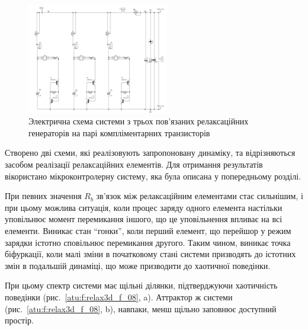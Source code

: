 \documentclass[a4paper,13pt]{atuaref}
\begin{document}

\begin{figure}[htb!]
  \centerline{\includegraphics[width=0.55\textwidth]{p7/p/relax3d_schem.png} }
  \caption{Электрична схема системи з трьох пов'язаних релаксаційних генераторів на парі компліментарних транзисторів}
  \label{atu:f:relax3d_schem}
\end{figure}


Створено дві схеми,
які реалізовують запропоновану динаміку, та відрізняються
засобом реалізації релаксаційних елементів.
Для отримання результатів вікористано мікроконтролерну систему,
яка була описана у попередньому розділі.

При певних значення $R_b$ зв'язок між релаксаційним елементами стає сильнішим,
і при цьому можлива ситуація, коли
процес заряду одного елемента настільки уповільнює момент перемикання іншого,
що це уповільнення впливає на всі елементи. Виникає стан ``гонки'', коли
перший елемент, що перейшор у режим зарядки істотно сповільнює перемикання другого. Таким
чином, виникає точка біфуркації, коли малі зміни в початковому стані системи
призводять до істотних змін в подальшій динаміці, що може призводити до
хаотичної поведінки.

При цьому спектр системи має щільні ділянки, підтверджуючи хаотичність
поведінки (рис.~\ref{atu:f:relax3d_f_08}, a). Аттрактор ж системи
(рис.~\ref{atu:f:relax3d_f_08}, b), навпаки, менш щільно заповнює
доступний простір.
\end{document}
